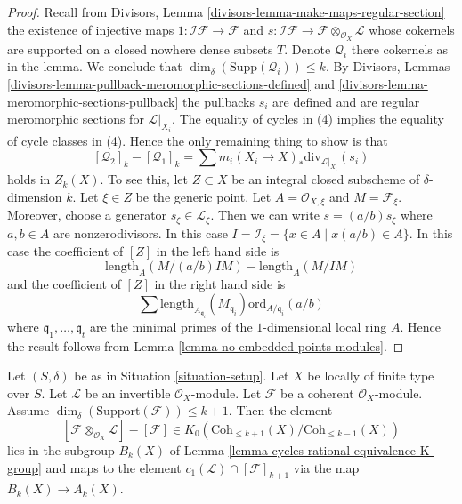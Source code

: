 \begin{proof}
Recall from Divisors, Lemma \ref{divisors-lemma-make-maps-regular-section}
the existence of injective maps
$1 : \mathcal{I}\mathcal{F} \to \mathcal{F}$ and
$s : \mathcal{I}\mathcal{F} \to \mathcal{F} \otimes_{\mathcal{O}_X}\mathcal{L}$
whose cokernels are supported on a closed nowhere dense subsets $T$.
Denote $\mathcal{Q}_i$ there cokernels as in the lemma.
We conclude that $\dim_\delta(\text{Supp}(\mathcal{Q}_i)) \leq k$.
By Divisors, Lemmas \ref{divisors-lemma-pullback-meromorphic-sections-defined}
and \ref{divisors-lemma-meromorphic-sections-pullback} the pullbacks $s_i$
are defined and are regular meromorphic sections for $\mathcal{L}|_{X_i}$.
The equality of cycles in (4) implies the equality of cycle classes
in (4). Hence the only remaining thing to show is that
$$
[\mathcal{Q}_2]_k - [\mathcal{Q}_1]_k
=
\sum m_i(X_i \to X)_*\text{div}_{\mathcal{L}|_{X_i}}(s_i)
$$
holds in $Z_k(X)$. To see this, let $Z \subset X$ be an integral closed
subscheme of $\delta$-dimension $k$. Let $\xi \in Z$ be the generic point.
Let $A = \mathcal{O}_{X, \xi}$ and $M = \mathcal{F}_\xi$.
Moreover, choose a generator $s_\xi \in \mathcal{L}_\xi$.
Then we can write $s = (a/b) s_\xi$ where $a, b \in A$ are
nonzerodivisors. In this case
$I = \mathcal{I}_\xi = \{x \in A \mid x(a/b) \in A\}$.
In this case the coefficient of $[Z]$ in the left hand side is
$$
\text{length}_A(M/(a/b)IM) - \text{length}_A(M/IM)
$$
and the coefficient of $[Z]$ in the right hand side
is
$$
\sum
\text{length}_{A_{\mathfrak q_i}}(M_{\mathfrak q_i})
\text{ord}_{A/\mathfrak q_i}(a/b)
$$
where $\mathfrak q_1, \ldots, \mathfrak q_t$ are the minimal
primes of the $1$-dimensional local ring $A$. Hence the result
follows from Lemma \ref{lemma-no-embedded-points-modules}.
\end{proof}

\begin{lemma}
\label{lemma-coherent-sheaf-cap-c1}
Let $(S, \delta)$ be as in Situation \ref{situation-setup}.
Let $X$ be locally of finite type over $S$.
Let $\mathcal{L}$ be an invertible $\mathcal{O}_X$-module.
Let $\mathcal{F}$ be a coherent $\mathcal{O}_X$-module.
Assume $\dim_\delta(\text{Support}(\mathcal{F})) \leq k + 1$.
Then the element
$$
[\mathcal{F} \otimes_{\mathcal{O}_X} \mathcal{L}]
-
[\mathcal{F}]
\in
K_0(\text{Coh}_{\leq k + 1}(X)/\text{Coh}_{\leq k - 1}(X))
$$
lies in the subgroup $B_k(X)$ of
Lemma \ref{lemma-cycles-rational-equivalence-K-group} and maps to
the element $c_1(\mathcal{L}) \cap [\mathcal{F}]_{k + 1}$ via
the map $B_k(X) \to A_k(X)$.
\end{lemma}

